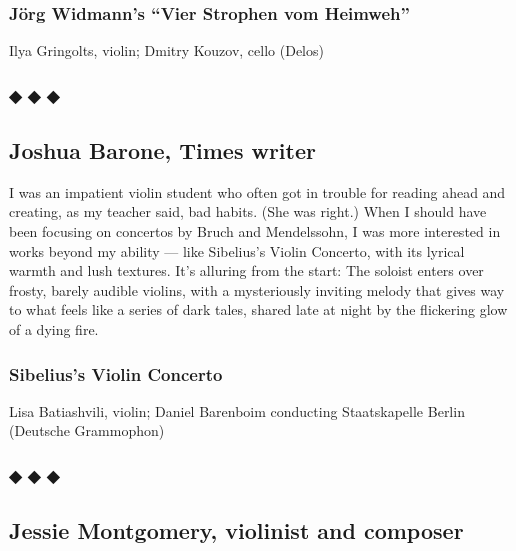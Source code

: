 \hypertarget{juxf6rg-widmanns-vier-strophen-vom-heimweh}{%
\subsubsection{Jörg Widmann's ``Vier Strophen vom
Heimweh''}\label{juxf6rg-widmanns-vier-strophen-vom-heimweh}}

Ilya Gringolts, violin; Dmitry Kouzov, cello (Delos)

\hypertarget{---7}{%
\subsubsection{◆ ◆ ◆}\label{---7}}

\hypertarget{joshua-barone-times-writer}{%
\subsection{Joshua Barone, Times
writer}\label{joshua-barone-times-writer}}

I was an impatient violin student who often got in trouble for reading
ahead and creating, as my teacher said, bad habits. (She was right.)
When I should have been focusing on concertos by Bruch and Mendelssohn,
I was more interested in works beyond my ability --- like Sibelius's
Violin Concerto, with its lyrical warmth and lush textures. It's
alluring from the start: The soloist enters over frosty, barely audible
violins, with a mysteriously inviting melody that gives way to what
feels like a series of dark tales, shared late at night by the
flickering glow of a dying fire.

\hypertarget{sibeliuss-violin-concerto}{%
\subsubsection{Sibelius's Violin
Concerto}\label{sibeliuss-violin-concerto}}

Lisa Batiashvili, violin; Daniel Barenboim conducting Staatskapelle
Berlin (Deutsche Grammophon)

\hypertarget{---8}{%
\subsubsection{◆ ◆ ◆}\label{---8}}

\hypertarget{jessie-montgomery-violinist-and-composer}{%
\subsection{Jessie Montgomery, violinist and
composer}\label{jessie-montgomery-violinist-and-composer}}

